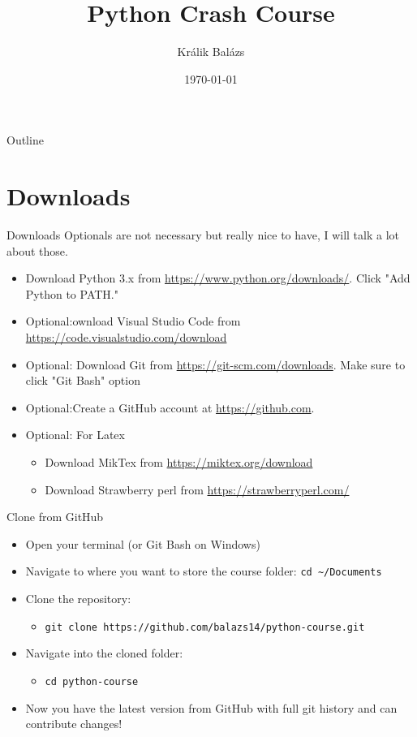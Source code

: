 \documentclass[aspectratio=169]{beamer}
\title{Python Crash Course}
\author{Králik Balázs}
\date{\today}
\begin{document}
\begin{frame}
    \titlepage
\end{frame}

\begin{frame}{Outline}
    \tableofcontents
\end{frame}

\section{Downloads}
\begin{frame}{Downloads}
Optionals are not necessary but really nice to have, I will talk a lot about those.
\begin{itemize}
    \item Download Python 3.x from \url{https://www.python.org/downloads/}. Click "Add Python to PATH."
    \item Optional:ownload Visual Studio Code from \url{https://code.visualstudio.com/download}
    \item Optional: Download Git from \url{https://git-scm.com/downloads}. Make sure to click "Git Bash" option
    \item Optional:Create a GitHub account at \url{https://github.com}.
    \item Optional: For Latex
    \begin{itemize}
        \item Download MikTex from \url{https://miktex.org/download}
        \item Download Strawberry perl from \url{https://strawberryperl.com/}
    \end{itemize}
\end{itemize}
\end{frame}

\begin{frame}{Clone from GitHub}
\begin{itemize}
    \item Open your terminal (or Git Bash on Windows)
    \item Navigate to where you want to store the course folder: \texttt{cd \textasciitilde/Documents}
    \item Clone the repository:
    \begin{itemize}
        \item \texttt{git clone https://github.com/balazs14/python-course.git}
    \end{itemize}
    \item Navigate into the cloned folder:
    \begin{itemize}
        \item \texttt{cd python-course}
    \end{itemize}
    \item Now you have the latest version from GitHub with full git history and can contribute changes!
\end{itemize}
\end{frame}
\end{document}

